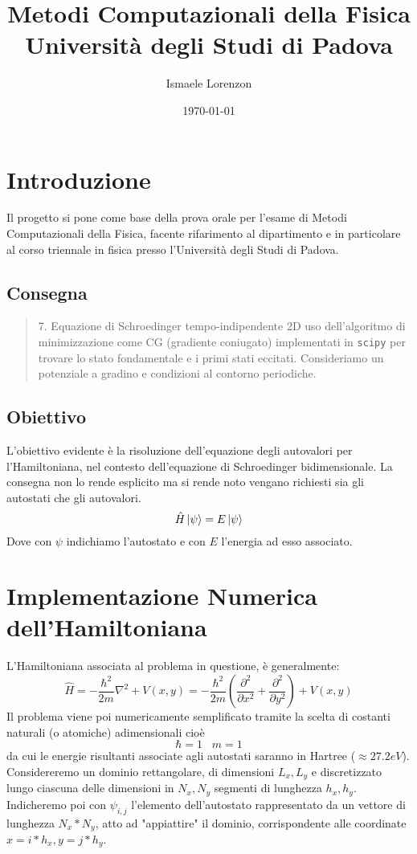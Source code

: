 \documentclass{article}
\title{Metodi Computazionali della Fisica\\Università degli Studi di Padova}
\author{Ismaele Lorenzon}
\date{\today}
\begin{document}
\maketitle

\section{Introduzione}
Il progetto si pone come base della prova orale per l'esame di Metodi Computazionali della Fisica, facente rifarimento al dipartimento e in particolare al corso 
triennale in fisica presso l'Università degli Studi di Padova.
\subsection{Consegna}
\begin{center}
\begin{quote}
7. Equazione di Schroedinger tempo-indipendente 2D uso dell’algoritmo di 
minimizzazione come  CG (gradiente coniugato) implementati in \texttt{scipy} per trovare lo 
stato fondamentale e i primi stati eccitati. Consideriamo un potenziale a gradino e 
condizioni al contorno periodiche. 
\end{quote}
\end{center}
\subsection{Obiettivo}
L'obiettivo evidente è la risoluzione dell'equazione degli autovalori per l'Hamiltoniana, nel contesto dell'equazione di Schroedinger bidimensionale. La consegna non 
lo rende esplicito ma si rende noto vengano richiesti sia gli autostati che gli autovalori.
\begin{equation}
    \hat{H}\ket{\psi}=E\ket{\psi}
\end{equation}
Dove con $\psi$ indichiamo l'autostato e con $E$ l'energia ad esso associato.
\section{Implementazione Numerica dell'Hamiltoniana}
L'Hamiltoniana associata al problema in questione, è generalmente:
\begin{equation}
    \hat{H} = -\frac{\hbar^2}{2m} \nabla^2 + V(x,y) = -\frac{\hbar^2}{2m} \left(\frac{\partial^2}{\partial x^2} + \frac{\partial^2}{\partial y^2}\right) + V(x,y)
\end{equation}
Il problema viene poi numericamente semplificato tramite la scelta di costanti naturali (o atomiche) adimensionali cioè
\begin{equation}
    \hbar=1 \hspace{10pt} m=1
\end{equation}
da cui le energie risultanti associate agli autostati saranno in Hartree ($\approx 27.2eV$). \\ Considereremo un dominio rettangolare, di dimensioni 
$L_x,L_y$ e discretizzato lungo ciascuna delle dimensioni in $N_x,N_y$ segmenti di lunghezza $h_x,h_y$. Indicheremo poi con $\psi_{i,j}$ l'elemento dell'autostato 
rappresentato da un vettore di lunghezza $N_x * N_y$, atto ad "appiattire" il dominio, corrispondente alle coordinate $x=i*h_x,y=j*h_y$.
\end{document}
